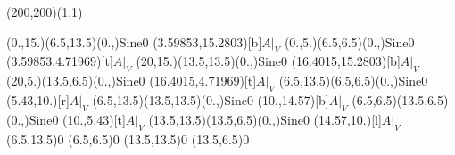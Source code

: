 \unitlength=1bp%

\begin{feynartspicture}(200,200)(1,1)

\FADiagram{}
\FAProp(0.,15.)(6.5,13.5)(0.,){Sine}{0}
\FALabel(3.59853,15.2803)[b]{$A|_V$}
\FAProp(0.,5.)(6.5,6.5)(0.,){Sine}{0}
\FALabel(3.59853,4.71969)[t]{$A|_V$}
\FAProp(20,15.)(13.5,13.5)(0.,){Sine}{0}
\FALabel(16.4015,15.2803)[b]{$A|_V$}
\FAProp(20,5.)(13.5,6.5)(0.,){Sine}{0}
\FALabel(16.4015,4.71969)[t]{$A|_V$}
\FAProp(6.5,13.5)(6.5,6.5)(0.,){Sine}{0}
\FALabel(5.43,10.)[r]{$A|_V$}
\FAProp(6.5,13.5)(13.5,13.5)(0.,){Sine}{0}
\FALabel(10.,14.57)[b]{$A|_V$}
\FAProp(6.5,6.5)(13.5,6.5)(0.,){Sine}{0}
\FALabel(10.,5.43)[t]{$A|_V$}
\FAProp(13.5,13.5)(13.5,6.5)(0.,){Sine}{0}
\FALabel(14.57,10.)[l]{$A|_V$}
\FAVert(6.5,13.5){0}
\FAVert(6.5,6.5){0}
\FAVert(13.5,13.5){0}
\FAVert(13.5,6.5){0}
\end{feynartspicture}

